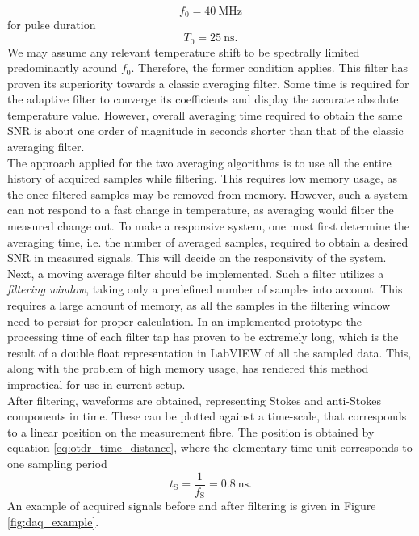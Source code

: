 \documentclass{standalone}
\begin{document}
\begin{equation}
f_0 = \SI{40}{\mega \hertz}
\end{equation}
for pulse duration
\begin{equation}
T_0 = \SI{25}{\nano \second} \textrm{.}
\end{equation}
We may assume any relevant temperature shift to be spectrally limited predominantly around $f_0$. Therefore, the former condition applies. This filter has proven its superiority towards a classic averaging filter. Some time is required for the adaptive filter to converge its coefficients and display the accurate absolute temperature value. However, overall averaging time required to obtain the same SNR is about one order of magnitude in seconds shorter than that of the classic averaging filter. \\

The approach applied for the two averaging algorithms is to use all the entire history of acquired samples while filtering. This requires low memory usage, as the once filtered samples may be removed from memory. However, such a system can not respond to a fast change in temperature, as averaging would filter the measured change out. To make a responsive system, one must first determine the averaging time, i.e. the number of averaged samples, required to obtain a desired SNR in measured signals. This will decide on the responsivity of the system. Next, a moving average filter should be implemented. Such a filter utilizes a \textit{filtering window}, taking only a predefined number of samples into account. This requires a large amount of memory, as all the samples in the filtering window need to persist for proper calculation. In an implemented prototype the processing time of each filter tap has proven to be extremely long, which is the result of a double float representation in LabVIEW of all the sampled data. This, along with the problem of high memory usage, has rendered this method impractical for use in current setup. \\

After filtering, waveforms are obtained, representing Stokes and anti-Stokes components in time. These can be plotted against a time-scale, that corresponds to a linear position on the measurement fibre. The position is obtained by equation \ref{eq:otdr_time_distance}, where the elementary time unit corresponds to one sampling period
\begin{equation}
t_\textrm{S} = \frac{1}{f_\textrm{S}} = \SI{0.8}{\nano \second} \textrm{.}
\end{equation}
An example of acquired signals before and after filtering is given in Figure \ref{fig:daq_example}.
\end{document}
